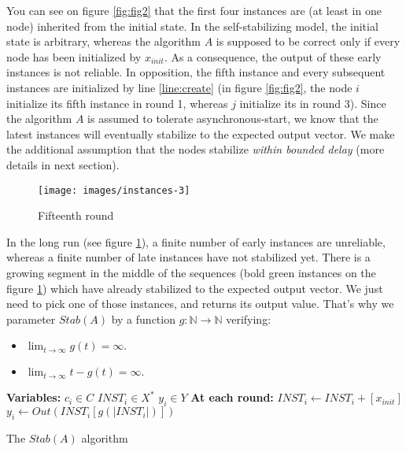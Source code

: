 \documentclass[11pt,letterpaper]{article}
\begin{document}
You can see on figure \ref{fig:fig2} that the first four instances are (at least in one node) inherited from the initial state.
In the self-stabilizing model, the initial state is arbitrary, whereas the algorithm $A$ is supposed to be correct only if every node has been initialized by $x_{init}$.
As a consequence, the output of these early instances is not reliable.
In opposition, the fifth instance and every subsequent instances are initialized by line \ref{line:create}
(in figure \ref{fig:fig2}, the node $i$ initialize its fifth instance in round 1, whereas $j$ initialize its in round 3).
Since the algorithm $A$ is assumed to tolerate asynchronous-start, we know that the latest instances will eventually stabilize to the expected output vector.
We make the additional assumption that the nodes stabilize \textit{within bounded delay} (more details in next section).

\begin{figure}[h!]
	\texttt{[image: images/instances-3]}
	\caption{Fifteenth round}
	\label{fig:fig3}
\end{figure}

In the long run (see figure \ref{fig:fig3}), a finite number of early instances are unreliable, whereas a finite number of late instances have not stabilized yet.
There is a growing segment in the middle of the sequences (bold green instances on the figure \ref{fig:fig3}) which have already stabilized to the expected output vector.
We just need to pick one of those instances, and returns its output value.
That's why we parameter $Stab(A)$ by a function $g : \mathds{N} \rightarrow \mathds{N}$ verifying:

\begin{itemize}
	\item $\lim_{t \rightarrow \infty} g(t) = \infty.$
	\item $\lim_{t \rightarrow \infty} t-g(t) = \infty.$
\end{itemize}

\begin{algorithm}[h!]
	\DontPrintSemicolon
	\textbf{Variables:} \;
	\Indp
		$c_i \in C$  \;
		$INST_i \in X^*$  \;
		$y_i \in Y$  \;
	\BlankLine
	\Indm
	\textbf{At each round:} \;
	\Indp
		$INST_i \leftarrow INST_i + [x_{init}]$  \label{line:create} \;
		$y_i \leftarrow Out(INST_i[g(|INST_i|)])$ \label{line:output} \;
	\Indm
	\caption{The $Stab(A)$ algorithm} 
\end{algorithm}
\end{document}

